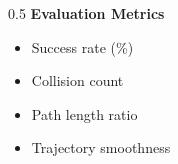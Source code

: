 \documentclass[aspectratio=169,9pt]{beamer}
\begin{document}
\begin{frame}
\begin{columns}[T]
\begin{column}{0.5\textwidth}
\textbf{\small Evaluation Metrics}
\begin{itemize}\setlength{\itemsep}{1pt}
    \item[\tiny$\bullet$] \footnotesize Success rate (\%)
    \item[\tiny$\bullet$] \footnotesize Collision count
    \item[\tiny$\bullet$] \footnotesize Path length ratio
    \item[\tiny$\bullet$] \footnotesize Trajectory smoothness
\end{itemize}
\end{column}
\end{columns}
\end{frame}
\end{document}
